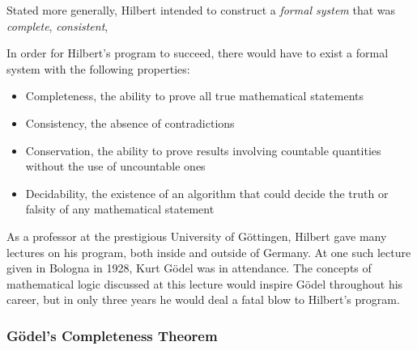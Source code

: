 Stated more generally, Hilbert intended to construct a \textit{formal system} that was \textit{complete}, \textit{consistent},

In order for Hilbert's program to succeed, there would have to exist a formal system with the following properties:
\begin{itemize}
	\item Completeness, the ability to prove all true mathematical statements
	\item Consistency, the absence of contradictions
	\item Conservation, the ability to prove results involving countable quantities without the use of uncountable ones
	\item Decidability, the existence of an algorithm that could decide the truth or falsity of any mathematical statement
\end{itemize}

As a professor at the prestigious University of G\"ottingen, Hilbert gave many lectures on his program, both inside and outside of Germany. At one such lecture given in Bologna in 1928, Kurt G\"odel was in attendance. The concepts of mathematical logic discussed at this lecture would inspire G\"odel throughout his career, but in only three years he would deal a fatal blow to Hilbert's program. \\




\subsubsection{G\"odel's Completeness Theorem}

